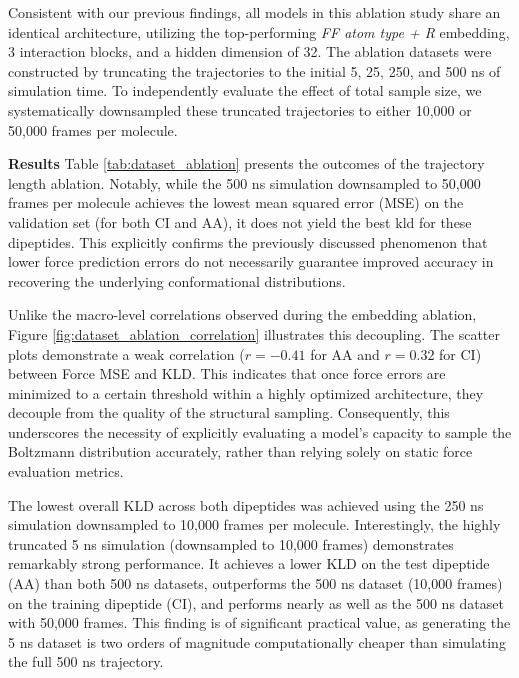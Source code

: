 Consistent with our previous findings, all models in this ablation study share an identical architecture, utilizing the top-performing \textit{FF atom type + R} embedding, 3 interaction blocks, and a hidden dimension of 32. The ablation datasets were constructed by truncating the trajectories to the initial 5, 25, 250, and 500 ns of simulation time. To independently evaluate the effect of total sample size, we systematically downsampled these truncated trajectories to either 10,000 or 50,000 frames per molecule.


\textbf{Results} Table \ref{tab:dataset_ablation} presents the outcomes of the trajectory length ablation. Notably, while the 500 ns simulation downsampled to 50,000 frames per molecule achieves the lowest mean squared error (MSE) on the validation set (for both CI and AA), it does not yield the best \gls{kld} for these dipeptides. This explicitly confirms the previously discussed phenomenon \citep{machine_learning_implicit_solvation} that lower force prediction errors do not necessarily guarantee improved accuracy in recovering the underlying conformational distributions. 

Unlike the macro-level correlations observed during the embedding ablation, Figure \ref{fig:dataset_ablation_correlation} illustrates this decoupling. The scatter plots demonstrate a weak correlation ($r = -0.41$ for AA and $r = 0.32$ for CI) between Force MSE and KLD. This indicates that once force errors are minimized to a certain threshold within a highly optimized architecture, they decouple from the quality of the structural sampling. Consequently, this underscores the necessity of explicitly evaluating a model's capacity to sample the Boltzmann distribution accurately, rather than relying solely on static force evaluation metrics.

The lowest overall KLD across both dipeptides was achieved using the 250 ns simulation downsampled to 10,000 frames per molecule. Interestingly, the highly truncated 5 ns simulation (downsampled to 10,000 frames) demonstrates remarkably strong performance. It achieves a lower KLD on the test dipeptide (AA) than both 500 ns datasets, outperforms the 500 ns dataset (10,000 frames) on the training dipeptide (CI), and performs nearly as well as the 500 ns dataset with 50,000 frames. This finding is of significant practical value, as generating the 5 ns dataset is two orders of magnitude computationally cheaper than simulating the full 500 ns trajectory.


